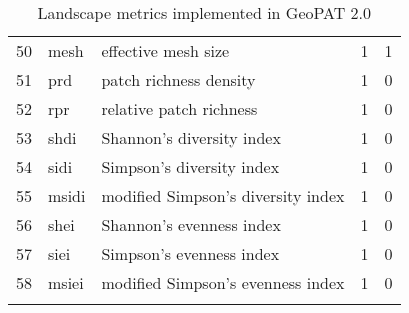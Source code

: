 \begin{longtable}{rllrr}
   50 & mesh & effective mesh size &   1 &   1 \\ 
   51 & prd & patch richness density &   1 &   0 \\ 
   52 & rpr & relative patch richness &   1 &   0 \\ 
   53 & shdi & Shannon's diversity index &   1 &   0 \\ 
   54 & sidi & Simpson's diversity index &   1 &   0 \\ 
   55 & msidi & modified Simpson's diversity index &   1 &   0 \\ 
   56 & shei & Shannon's evenness index &   1 &   0 \\ 
   57 & siei & Simpson's evenness index &   1 &   0 \\ 
   58 & msiei & modified Simpson's evenness index &   1 &   0 \\ 
  \hline
\caption{Landscape metrics implemented in GeoPAT 2.0} 
\label{lindtable}
\end{longtable}
